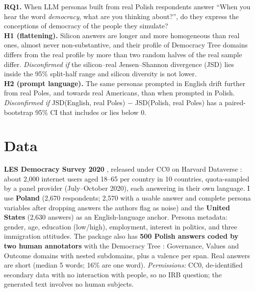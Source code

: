 \documentclass[10pt,twocolumn]{article}
\begin{document}
\begin{hypbox}
\textbf{RQ1.} When LLM personas built from real Polish respondents answer ``When you hear the word \emph{democracy}, what are you thinking about?'', do they express the conceptions of democracy of the people they simulate?\\[2pt]
\textbf{H1 (flattening).} Silicon answers are longer and more homogeneous than real ones, almost never non-substantive, and their profile of Democracy Tree domains differs from the real profile by more than two random halves of the real sample differ. \emph{Disconfirmed if} the silicon--real Jensen--Shannon divergence (JSD) lies inside the 95\% split-half range and silicon diversity is not lower.\\[2pt]
\textbf{H2 (prompt language).} The same personas prompted in English drift further from real Poles, and towards real Americans, than when prompted in Polish. \emph{Disconfirmed if} JSD(English, real Poles) $-$ JSD(Polish, real Poles) has a paired-bootstrap 95\% CI that includes or lies below 0.
\end{hypbox}

\section{Data}
\textbf{LES Democracy Survey 2020} \citep{dahlberg2026}, released under CC0 on Harvard Dataverse \citep{durlich2026}: about 2,000 internet users aged 18--65 per country in 10 countries, quota-sampled by a panel provider (July--October 2020), each answering in their own language. I use \textbf{Poland} (2,670 respondents; 2,570 with a usable answer and complete persona variables after dropping answers the authors flag as noise) and the \textbf{United States} (2,630 answers) as an English-language anchor. Persona metadata: gender, age, education (low/high), employment, interest in politics, and three immigration attitudes. The package also has \textbf{500 Polish answers coded by two human annotators} with the Democracy Tree \citep{dahlbergmorkenstam2024}: Governance, Values and Outcome domains with nested subdomains, plus a valence per span. Real answers are short (median 5 words; 16\% are one word). \emph{Permissions:} CC0, de-identified secondary data with no interaction with people, so no IRB question; the generated text involves no human subjects.
\end{document}
